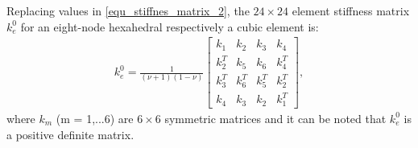 Replacing values in \eqref{equ_stiffnes_matrix_2}, the $24 \times 24$ element stiffness matrix \textbf{$k_e^0$} for an eight-node hexahedral respectively a cubic element is:
\begingroup
\renewcommand*{\arraystretch}{1.6}
\begin{align}
k_e^0 = \frac{1}{(\nu +1)(1-\nu)}
\begin{bmatrix}
k_1 & k_2 & k_3 & k_4 \\ 
k_2^T & k_5 & k_6 & k_4^T \\ 
k_3^T & k_6^T & k_5^T & k_2^T \\ 
k_4 & k_3 & k_2 & k_1^T
\end{bmatrix} ,
\end{align}
\endgroup
where $k_m$ (m = 1,...6) are $6 \times 6$ symmetric matrices and it can be noted that \textbf{$k_e^0$} is a positive definite matrix.\\


